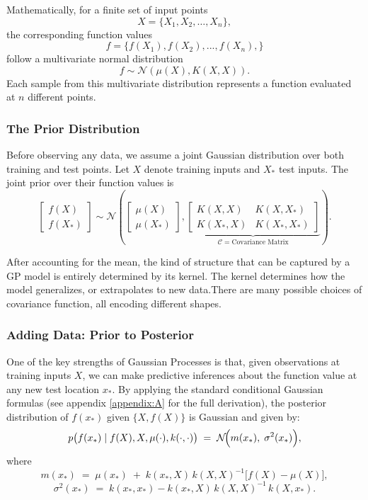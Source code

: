 \documentclass{article}
\begin{document}
\noindent
Mathematically, for a finite set of input points
\[ X = \{X_1, X_2, \dots, X_n\} ,\]
 the corresponding function values
\[
f = \{f(X_1),f(X_2),...,f(X_n), \}
\]
follow a multivariate normal distribution
\[
f \sim \mathcal{N}(\mu(X), K(X, X)).
\label{eq: Multivariate_distribution}
\]
Each sample from this multivariate distribution represents a function evaluated at \( n \) different points.

\subsubsection*{The Prior Distribution}
\label{sec: prior_dist}

Before observing any data, we assume a joint Gaussian distribution over both training and test points. Let \( X \) denote training inputs and \( X_* \) test inputs. 
The joint prior over their function values is
\[
\begin{bmatrix}
f(X) \\
f(X_*)
\end{bmatrix}
\sim \mathcal{N}
\left(
\begin{bmatrix}
\mu(X) \\
\mu(X_*)
\end{bmatrix},
\underbrace{
\begin{bmatrix}
K(X, X) & K(X, X_*) \\
K(X_*, X) & K(X_*, X_*)
\end{bmatrix}
}_{\mathcal{C} = \text{Covariance Matrix}}
\right).
\label{eq: Multivariate prior}
\]

\noindent
After accounting for the mean, the kind of structure that can be captured by a
GP model is entirely determined by its kernel. The kernel determines how the model
generalizes, or extrapolates to new data.There are many possible choices of covariance function, all encoding different shapes.


\subsubsection*{Adding Data: Prior to Posterior}
\label{sec: priortoposterior}

One of the key strengths of Gaussian Processes is that, given observations at training inputs \(X\),
we can make predictive inferences about the function value at any new test location \(x_*\).
By applying the standard conditional Gaussian formulas (see appendix \ref{appendix:A} for the full derivation),
the posterior distribution of \(f(x_*)\) given \(\{X, f(X)\}\) is Gaussian and given by:
\[
p\bigl(f(x_*) \mid f(X), X, \mu(\cdot), k(\cdot,\cdot)\bigr)
\;=\;
\mathcal{N}\!\Bigl(
m(x_*),\;\sigma^2(x_*)
\Bigr),
\label{eq: predictive_dist}
\]
where
\[m(x_*) \;=\; \mu(x_*) \;+\;k(x_*, X)\,k(X, X)^{-1}\bigl[f(X) - \mu(X)\bigr],
\label{eq: predictive_mean}\]
\[\sigma^2(x_*) \;=\;k(x_*, x_*) - k(x_*, X)\,k(X, X)^{-1}\,k(X, x_*).
\label{eq: predictive_variance}\]
\end{document}
